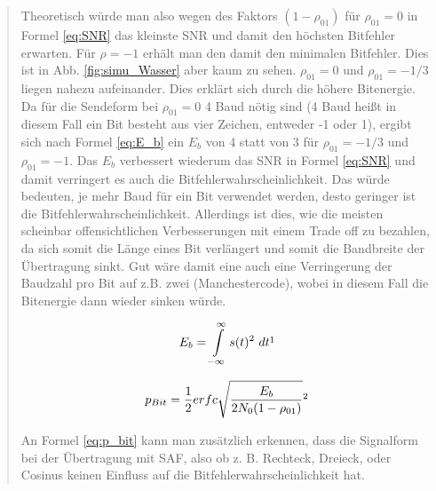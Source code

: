 \begin{quote}
    Theoretisch würde man also wegen des Faktors $(1-\rho_{01})$ für $\rho_{01}=0$ in Formel \ref{eq:SNR} das kleinste
    SNR und damit den höchsten Bitfehler erwarten. Für $\rho=-1$ erhält man den damit den minimalen Bitfehler.  Dies ist
    in Abb. \ref{fig:simu_Wasser} aber kaum zu sehen.
    $\rho_{01}=0$ und $\rho_{01}=-1/3$ liegen nahezu aufeinander. Dies erklärt sich durch die höhere Bitenergie. Da für die
    Sendeform bei $\rho_{01}=0$ 4 Baud nötig sind (4 Baud heißt in diesem Fall ein Bit besteht aus vier Zeichen,
    entweder -1 oder 1), ergibt sich nach Formel \ref{eq:E_b} ein $E_{b}$ von 4 statt von 3 für $\rho_{01} = -1/3$ und
    $\rho_{01}= -1$. Das $E_{b}$ verbessert wiederum das SNR in Formel \ref{eq:SNR} und damit verringert es auch die
    Bitfehlerwahrscheinlichkeit. Das würde bedeuten, je mehr Baud für ein Bit verwendet werden, desto geringer ist die
    Bitfehlerwahrscheinlichkeit. Allerdings ist dies, wie die meisten scheinbar offensichtlichen Verbesserungen mit
    einem Trade off zu bezahlen, da sich somit die Länge eines Bit verlängert und somit die Bandbreite der Übertragung
    sinkt. Gut wäre damit eine auch eine Verringerung der Baudzahl pro Bit auf z.B. zwei (Manchestercode), wobei in
    diesem Fall die Bitenergie dann wieder sinken würde.
        
    \begin{equation}
        \begin{split}
            E_{b}= \int\limits_{-\infty}^{\infty} s(t)^2 \ dt
        \end{split}
        \footnotemark
    \end{equation}  
    \label{eq:E_b}
    
    \begin{equation}
	     \begin{split}
		p_{Bit}=\frac{1}{2}erfc  \sqrt{\frac{E_{b}}{2N_{0}(1-\rho_{01})}}
           \footnotemark
	     \end{split}
    \end{equation}  
	 \label{eq:p_bit}
        
	An Formel \ref{eq:p_bit} kann man zusätzlich erkennen, dass die Signalform bei der Übertragung mit SAF, also ob z. B.
	Rechteck, Dreieck, oder Cosinus keinen Einfluss auf die Bitfehlerwahrscheinlichkeit hat.\\
    

\end{quote}
